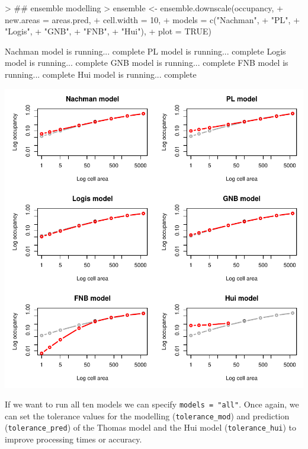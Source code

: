 \documentclass{article}[12pt, a4paper]
\begin{document}
\begin{Schunk}
\begin{Sinput}
> ## ensemble modelling
> ensemble <- ensemble.downscale(occupancy,
+                                new.areas = areas.pred,
+                                cell.width = 10,
+                                models = c("Nachman",
+                                           "PL",
+                                           "Logis",
+                                           "GNB",
+                                           "FNB",
+                                           "Hui"),
+                                plot = TRUE)
\end{Sinput}
\begin{Soutput}
Nachman model is running...  complete 
PL model is running...  complete 
Logis model is running...  complete 
GNB model is running...  complete 
FNB model is running...  complete 
Hui model is running...  complete 

\end{Soutput}
\end{Schunk}
\includegraphics{Downscaling-downscale23}

If we want to run all ten models we can specify \texttt{models = "all"}. Once again, we can set the tolerance values for the modelling (\texttt{tolerance\_mod}) and prediction (\texttt{tolerance\_pred}) of the Thomas model and the Hui model (\texttt{tolerance\_hui}) to improve processing times or accuracy.
\end{document}
